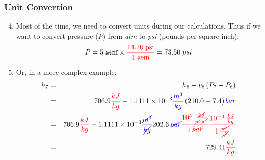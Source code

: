 \documentclass[10pt,compress,handout,ignorenonframetext]{beamer}
\begin{document}

\begin{frame}
 \frametitle{Unit Convertion}
  \begin{enumerate}\setcounter{enumi}{3}
   \item<1-> Most of the time, we need to convert units during our calculations. Thus if we want to convert pressure ($P$) from {\it atm} to {\it psi} (pounds per square inch):
      \begin{displaymath}
        P = 5\;\cancel{\text{atm}} \times \textcolor{red}{\displaystyle\frac{14.70\;\text{psi}}{1\;\cancel{\text{atm}}}} = 73.50\;psi
      \end{displaymath}
   \item<2-> Or, in a more complex example:
      \begin{eqnarray}
        h_{7} &=& h_{6} + v_{6}\left(P_{7}-P_{6}\right) \nonumber \\
              &=& 706.9\textcolor{red}{\frac{kJ}{kg}} + 1.1111\times 10^{-3}\textcolor{blue}{\frac{m^{3}}{kg}}\left(210.0-7.4\right)\textcolor{blue}{bar} \nonumber \\
              &=& 706.9\textcolor{red}{\frac{kJ}{kg}} + 1.1111\times 10^{-3}\textcolor{blue}{\frac{\cancel{m^{3}}}{\cancel{kg}}} 202.6\;\textcolor{blue}{\cancel{bar}} \textcolor{red}{\frac{10^{5}\;\frac{\cancel{kg}}{\cancel{m}.\cancel{s^{2}}}}{1\; \cancel{bar}}} \textcolor{red}{\frac{10^{-3}\; \frac{kJ}{kg}}{1\;\frac{\cancel{m^{2}}}{\cancel{s^{2}}}}} \nonumber \\
              &=& 729.41\textcolor{red}{\frac{kJ}{kg}} \nonumber 
      \end{eqnarray} 
  \end{enumerate}
\end{frame}
\end{document}
